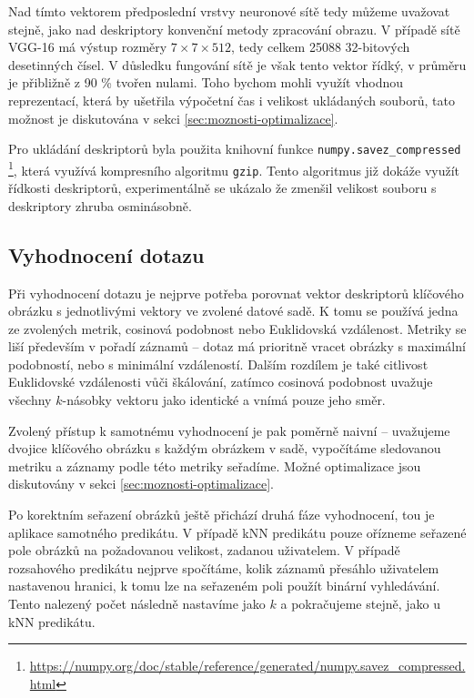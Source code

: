 \documentclass[12pt]{article}
\begin{document}
Nad tímto vektorem předposlední vrstvy neuronové sítě tedy můžeme uvažovat stejně, jako nad deskriptory konvenční metody zpracování obrazu.
V případě sítě VGG-16 má výstup rozměry $7 \times 7 \times 512$, tedy celkem 25088 32-bitových desetinných čísel.
V důsledku fungování sítě je však tento vektor řídký, v průměru je přibližně z 90 \% tvořen nulami.
Toho bychom mohli využít vhodnou reprezentací, která by ušetřila výpočetní čas i velikost ukládaných souborů, tato možnost je diskutována v sekci \ref{sec:moznosti-optimalizace}.

Pro ukládání deskriptorů byla použita knihovní funkce \texttt{numpy.savez\_compressed}%
\footnote{\url{https://numpy.org/doc/stable/reference/generated/numpy.savez_compressed.html}},
která využívá kompresního algoritmu \texttt{gzip}.
Tento algoritmus již dokáže využít řídkosti deskriptorů, experimentálně se ukázalo že zmenšil velikost souboru s deskriptory zhruba osminásobně.

\subsection{Vyhodnocení dotazu}\label{sec:vyhodnoceni-dotazu}

Při vyhodnocení dotazu je nejprve potřeba porovnat vektor deskriptorů klíčového obrázku s jednotlivými vektory ve zvolené datové sadě.
K tomu se používá jedna ze zvolených metrik, cosinová podobnost nebo Euklidovská vzdálenost.
Metriky se liší především v pořadí záznamů -- dotaz má prioritně vracet obrázky s maximální podobností, nebo s minimální vzdáleností.
Dalším rozdílem je také citlivost Euklidovské vzdálenosti vůči škálování, zatímco cosinová podobnost uvažuje všechny $k$-násobky vektoru jako identické a vnímá pouze jeho směr.

Zvolený přístup k samotnému vyhodnocení je pak poměrně naivní -- uvažujeme dvojice klíčového obrázku s každým obrázkem v sadě, vypočítáme sledovanou metriku a záznamy podle této metriky seřadíme.
Možné optimalizace jsou diskutovány v sekci \ref{sec:moznosti-optimalizace}.

Po korektním seřazení obrázků ještě přichází druhá fáze vyhodnocení, tou je aplikace samotného predikátu.
V případě kNN predikátu pouze ořízneme seřazené pole obrázků na požadovanou velikost, zadanou uživatelem.
V případě rozsahového predikátu nejprve spočítáme, kolik záznamů přesáhlo uživatelem nastavenou hranici, k tomu lze na seřazeném poli použít binární vyhledávání.
Tento nalezený počet následně nastavíme jako $k$ a pokračujeme stejně, jako u kNN predikátu.
\end{document}
